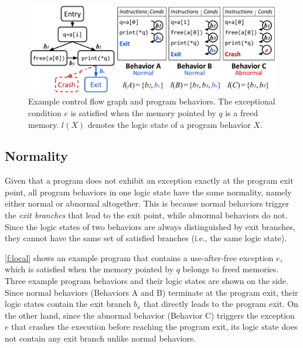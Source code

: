 \documentclass[letterpaper,twocolumn,10pt]{article}
\begin{document}
\begin{figure}[t]
  \centering
  \includegraphics[width=\columnwidth]{images/local.pdf}
  \caption{Example control flow graph and program behaviors. The exceptional
  condition $e$ is satisfied when the memory pointed by $q$ is a freed
  memory. $l(X)$ denotes the logic state of a program behavior $X$.}
  \label{f:local}
\end{figure}

\subsection{Normality}
\label{s:prop:local}

Given that a program does not exhibit an exception exactly at the program exit
point, all program behaviors in one logic state have the same normality, namely
either normal or abnormal altogether.
%
This is because normal behaviors trigger the \emph{exit branches} that
lead to the exit point, while abnormal behaviors do not. Since the logic
states of two behaviors are always distinguished by exit branches, they cannot
have the same set of satisfied branches (i.e., the same logic state).

\autoref{f:local} shows an example program that contains a use-after-free
exception $e$, which is satisfied when the memory pointed by $q$ belongs to
freed memories. Three example program behaviors and their logic states are shown
on the side. Since normal behaviors (Behaviors A and B) terminate at the program
exit, their logic states contain the exit branch $b_x$ that directly leads to
the program exit. On the other hand, since the abnormal behavior (Behavior C)
triggers the exception $e$ that crashes the execution before reaching the
program exit, its logic state does not contain any exit branch unlike normal
behaviors.
\end{document}
